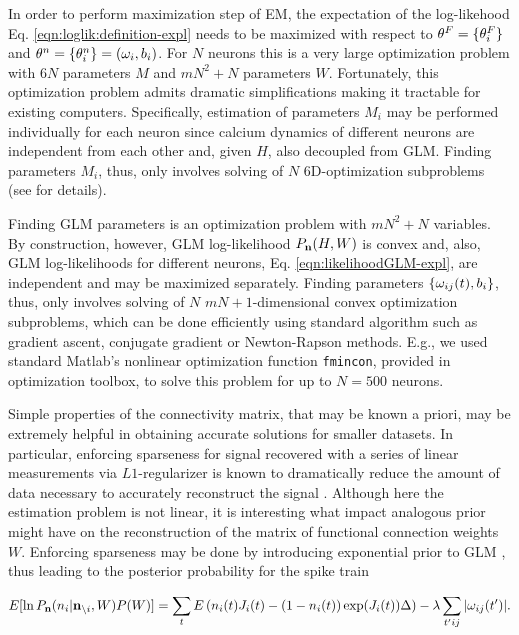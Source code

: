 In order to perform maximization step of EM, the expectation of the log-likehood  Eq. \eqref{eqn:loglik:definition-expl} needs to be maximized with respect to $\mathbf{\theta}^F=\{\mathbf{\theta}^F_i\}$ and $\mathbf{\theta}^n = \{\mathbf{\theta}^n_i\} = (\mathbf{\omega}_i, b_i)$. For $N$ neurons this is a very large optimization problem with $6N$ parameters $M$ and $m N^2 + N$ parameters $W$.  Fortunately, this optimization problem admits dramatic simplifications making it tractable for existing computers.  Specifically, estimation of parameters $M_i$ may be performed individually for each neuron since calcium dynamics of different neurons are independent from each other and, given $H$, also decoupled from GLM. Finding parameters $M_i$, thus, only involves solving of $N$ 6D-optimization subproblems (see \cite{Vogelstein2009} for details).

Finding GLM parameters is an optimization problem with $mN^2+N$ variables. By construction, however, GLM log-likelihood $P_{{\bf n}}(H, W)$ is convex and, also, GLM log-likelihoods for different neurons, Eq. \eqref{eqn:likelihoodGLM-expl}, are independent and may be maximized separately. Finding parameters $\{\omega_{ij}(t), b_i\}$, thus, only involves solving of $N$ $mN+1$-dimensional convex optimization subproblems, which can be done efficiently using standard algorithm such as gradient ascent, conjugate gradient or Newton-Rapson methods. E.g., we used standard Matlab's nonlinear optimization function \texttt{fmincon}, provided in optimization toolbox, to solve this problem for up to $N=500$ neurons.

Simple properties of the connectivity matrix, that may be known a priori, may be extremely helpful in obtaining accurate solutions for smaller datasets. In particular, enforcing sparseness for signal recovered with a series of linear measurements via $L1$-regularizer is known to dramatically reduce the amount of data necessary to accurately reconstruct the signal \cite{Candes2005, DE03, Mishchenko2009}. Although here the estimation problem is not linear, it is interesting what impact analogous prior might have on the reconstruction of the matrix of functional connection weights $W$. Enforcing sparseness may be done by introducing exponential prior to GLM \cite{Stevenson2009}, thus leading to the posterior probability for the spike train

\begin{equation}\label{eqn:likelihoodsparseGLM}
E[\ln P_{{\bf n}}(n_i|{\bf n}_{\backslash i}, W)P(W)]=\sum_t E\left( n_i(t) J_i(t) - (1-n_i(t)) \exp(J_i(t)) \Delta \right)-\lambda \sum_{t'ij}|\omega_{ij}(t')|.
\end{equation}

